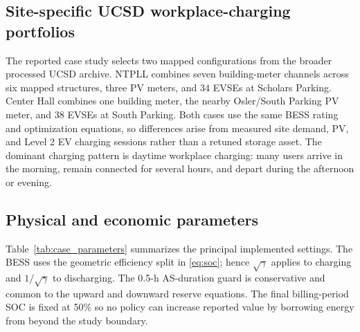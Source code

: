 \documentclass[final,5p,times]{elsarticle}
\begin{document}
\subsection{Site-specific UCSD workplace-charging portfolios}
The reported case study selects two mapped configurations from the broader processed UCSD archive. NTPLL combines seven building-meter channels across six mapped structures, three PV meters, and 34 EVSEs at Scholars Parking. Center Hall combines one building meter, the nearby Osler/South Parking PV meter, and 38 EVSEs at South Parking. Both cases use the same BESS rating and optimization equations, so differences arise from measured site demand, PV, and Level 2 EV charging sessions rather than a retuned storage asset. The dominant charging pattern is daytime workplace charging: many users arrive in the morning, remain connected for several hours, and depart during the afternoon or evening.

\subsection{Physical and economic parameters}
Table~\ref{tab:case_parameters} summarizes the principal implemented settings. The BESS uses the geometric efficiency split in \eqref{eq:soc}; hence $\sqrt{\gamma}$ applies to charging and $1/\sqrt{\gamma}$ to discharging. The 0.5-h AS-duration guard is conservative and common to the upward and downward reserve equations. The final billing-period SOC is fixed at 50\% so no policy can increase reported value by borrowing energy from beyond the study boundary.
\end{document}
